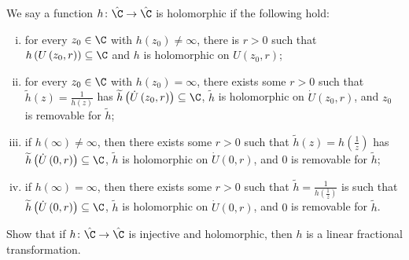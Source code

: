 \documentclass[10pt]{mypackage}
\begin{document}
\begin{problem}[Problem 3]
  We say a function $h\colon \hat{\C}\rightarrow \hat{\C}$ is holomorphic if the following hold:
  \begin{enumerate}[(i)]
    \item for every $z_0\in \C$ with $h\left( z_0 \right)\neq \infty$, there is $r > 0$ such that $h\left( U\left( z_0,r \right) \right)\subseteq \C$ and $h$ is holomorphic on $U\left( z_0,r \right)$;
    \item for every $z_0\in \C$ with $h\left( z_0 \right) = \infty$, there exists some $r > 0$ such that $ \widetilde{h}(z) = \frac{1}{h(z)} $ has $\widetilde{h}\left( \dot{U}\left( z_0,r \right) \right)\subseteq \C$, $ \widetilde{h} $ is holomorphic on $\dot{U}\left( z_0,r \right)$, and $z_0$ is removable for $ \widetilde{h} $;
    \item if $h\left( \infty \right) \neq \infty$, then there exists some $r > 0$ such that $ \widetilde{h}(z) = h\left( \frac{1}{z} \right) $ has $\widetilde{h}\left( \dot{U}\left( 0,r \right) \right)\subseteq \C$, $\widetilde{h}$ is holomorphic on $\dot{U}\left( 0,r \right)$, and $0$ is removable for $\widetilde{h}$;
    \item if $h\left( \infty \right) = \infty$, then there exists some $r > 0$ such that $\widetilde{h} = \frac{1}{h\left( \frac{1}{z} \right)}$ is such that $ \widetilde{h}\left( \dot{U}\left( 0,r \right) \right)\subseteq \C $, $\widetilde{h}$ is holomorphic on $\dot{U}\left( 0,r \right)$, and $0$ is removable for $\widetilde{h}$.
  \end{enumerate}
  Show that if $h\colon \hat{\C}\rightarrow \hat{\C}$ is injective and holomorphic, then $h$ is a linear fractional transformation.
\end{problem}
\end{document}
